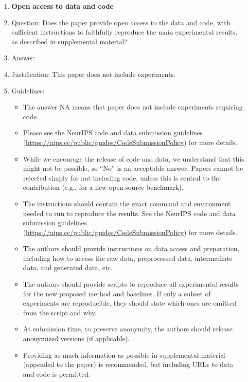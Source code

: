 \documentclass{article}
\begin{document}
\begin{enumerate}
\item {\bf Open access to data and code}
    \item[] Question: Does the paper provide open access to the data and code, with sufficient instructions to faithfully reproduce the main experimental results, as described in supplemental material?
    \item[] Answer: \answerNA{} %
    \item[] Justification: This paper does not include experiments.
    \item[] Guidelines:
    \begin{itemize}
        \item The answer NA means that paper does not include experiments requiring code.
        \item Please see the NeurIPS code and data submission guidelines (\url{https://nips.cc/public/guides/CodeSubmissionPolicy}) for more details.
        \item While we encourage the release of code and data, we understand that this might not be possible, so “No” is an acceptable answer. Papers cannot be rejected simply for not including code, unless this is central to the contribution (e.g., for a new open-source benchmark).
        \item The instructions should contain the exact command and environment needed to run to reproduce the results. See the NeurIPS code and data submission guidelines (\url{https://nips.cc/public/guides/CodeSubmissionPolicy}) for more details.
        \item The authors should provide instructions on data access and preparation, including how to access the raw data, preprocessed data, intermediate data, and generated data, etc.
        \item The authors should provide scripts to reproduce all experimental results for the new proposed method and baselines. If only a subset of experiments are reproducible, they should state which ones are omitted from the script and why.
        \item At submission time, to preserve anonymity, the authors should release anonymized versions (if applicable).
        \item Providing as much information as possible in supplemental material (appended to the paper) is recommended, but including URLs to data and code is permitted.
    \end{itemize}



\end{enumerate}
\end{document}
